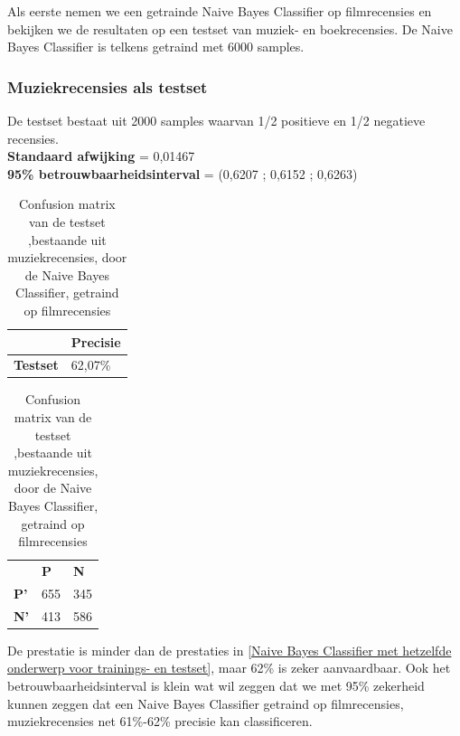 Als eerste nemen we een getrainde Naive Bayes Classifier op filmrecensies en bekijken we de resultaten op een testset van muziek- en boekrecensies. De Naive Bayes Classifier is telkens getraind met 6000 samples.

\subsubsection{Muziekrecensies als testset}\label{Muziekrecensies als testset-movie}

De testset bestaat uit 2000 samples waarvan 1/2 positieve en 1/2 negatieve recensies.\\

\textbf{Standaard afwijking} = 0,01467\\
\textbf{95\% betrouwbaarheidsinterval} = (0,6207 ; 0,6152 ; 0,6263)\\
 
\begin{table}[h]
\centering
\setlength\tabcolsep{4pt}
\begin{minipage}[t]{0.48\textwidth}
\centering
\begin{tabular}{l|l|}
\cline{2-2}
                                            & \textbf{Precisie} \\ \hline
\multicolumn{1}{|l|}{\textbf{Testset}}      & 62,07\%           \\ \hline
\end{tabular}
\caption{Classificatieprecisie Naive Bayes Classifier, getraind op filmrecensies, getest op muziekrecensies}
\end{minipage}%
\hfill
\begin{minipage}[t]{0.48\textwidth}
\centering
\begin{tabular}{lll}
                                 & \textbf{P}               & \textbf{N}               \\ \cline{2-3} 
\multicolumn{1}{l|}{\textbf{P'}} & \multicolumn{1}{l|}{655} & \multicolumn{1}{l|}{345} \\ \cline{2-3} 
\multicolumn{1}{l|}{\textbf{N'}} & \multicolumn{1}{l|}{413} & \multicolumn{1}{l|}{586} \\ \cline{2-3} 
\end{tabular}
\caption{Confusion matrix van de testset ,bestaande uit muziekrecensies, door de  Naive Bayes Classifier, getraind op filmrecensies} 
\end{minipage}
\end{table}

De prestatie is minder dan de prestaties in \ref{Naive Bayes Classifier met hetzelfde onderwerp voor trainings- en testset}, maar 62\% is zeker aanvaardbaar. Ook het betrouwbaarheidsinterval is klein wat wil zeggen dat we  met 95\% zekerheid kunnen zeggen dat een Naive Bayes Classifier getraind op filmrecensies, muziekrecensies net 61\%-62\% precisie kan classificeren.  

